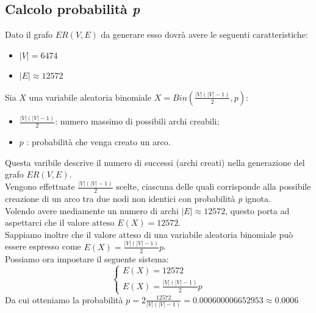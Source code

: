 \documentclass{article}
\begin{document}
\subsection*{Calcolo probabilità \textit{p}}
Dato il grafo $ER(V,E)$ da generare esso dovrà avere le seguenti caratteristiche:
\begin{itemize}
	\item $|V|= 6474$
	\item $|E| \approx 12572$
\end{itemize}
Sia $X$ una variabile aleatoria binomiale $X=Bin(\frac{|V|(|V|-1)}{2},p)$:
\begin{itemize}
	\item $\frac{|V|(|V|-1)}{2}$: numero massimo di possibili archi creabili;
	\item $p$ : probabilità che venga creato un arco.
\end{itemize} 
Questa varibile descrive il numero di successi (archi creati) nella generazione del grafo $ER(V,E)$.\\
Vengono effettuate $\frac{|V|(|V|-1)}{2}$ scelte, ciascuna delle quali corrisponde alla possibile creazione di un arco tra due nodi non identici con probabilità \textit{p} ignota.\\
Volendo avere mediamente un numero di archi $|E| \approx 12572$, questo porta ad aspettarci che il valore atteso $E(X) = 12572$.\\
Sappiamo inoltre che il valore atteso di una variabile aleatoria binomiale può essere espresso come  $E(X)=\frac{|V|(|V|-1)}{2}p$.\\
Possiamo ora impostare il seguente sistema:
$$
\begin{cases}
	E(X) = 12572               \\ 
	E(X)=\frac{|V|(|V|-1)}{2}p 
\end{cases}
$$
Da cui otteniamo la probabilità $p = 2\frac{12572}{|V|(|V|-1)} = 0.000600006652953 \approx 0.0006$
\end{document}
